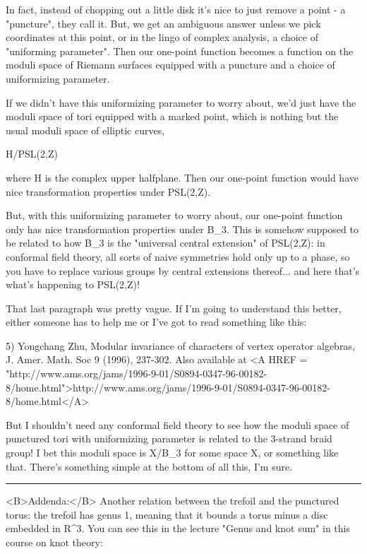 In fact, instead of chopping out a little disk it's nice to just
remove a point - a "puncture", they call it.  But, we get an ambiguous
answer unless we pick coordinates at this point, or in the lingo of
complex analysis, a choice of "uniforming parameter".  Then our
one-point function becomes a function on the moduli space of Riemann
surfaces equipped with a puncture and a choice of uniformizing parameter.

If we didn't have this uniformizing parameter to worry about, we'd
just have the moduli space of tori equipped with a marked point, 
which is nothing but the usual moduli space of elliptic curves,

H/PSL(2,Z)

where H is the complex upper halfplane.  Then our one-point function
would have nice transformation properties under PSL(2,Z).  

But, with this uniformizing parameter to worry about, our one-point 
function only has nice transformation properties under B_{3}.  This 
is somehow supposed to be related to how B_{3} is the "universal
central extension" of PSL(2,Z): in conformal field theory, all sorts
of naive symmetries hold only up to a phase, so you have to replace
various groups by central extensions thereof... and here that's what's 
happening to PSL(2,Z)!

That last paragraph was pretty vague.  If I'm going to understand this
better, either someone has to help me or I've got to read something
like this:

5) Yongchang Zhu, Modular invariance of characters of vertex operator algebras,
J. Amer. Math. Soc 9 (1996), 237-302.  Also available at
<A HREF = "http://www.ams.org/jams/1996-9-01/S0894-0347-96-00182-8/home.html">http://www.ams.org/jams/1996-9-01/S0894-0347-96-00182-8/home.html</A>


But I shouldn't need any conformal field theory to see how the moduli
space of punctured tori with uniformizing parameter is related to the
3-strand braid group!  I bet this moduli space is X/B_{3} for
some space X, or something like that.  There's something simple at the
bottom of all this, I'm sure.

\par\noindent\rule{\textwidth}{0.4pt}
<B>Addenda:</B>  Another relation between the trefoil and
the punctured torus: the trefoil has genus 1, meaning that
it bounds a torus minus a disc embedded in R^{3}.
You can see this in the lecture "Genus and knot sum" in 
this course on knot theory:

